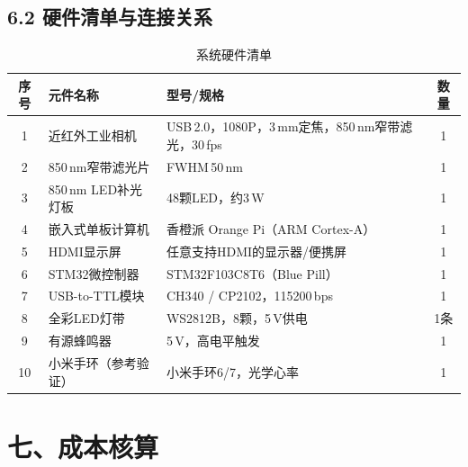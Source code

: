 \documentclass[a4paper,12pt]{article}
\begin{document}
\subsection*{6.2 硬件清单与连接关系}

\begin{table}[H]
  \centering
  \caption{系统硬件清单}
  \label{tab:bom}
  \renewcommand{\arraystretch}{1.3}
  \begin{tabular}{|c|p{4cm}|p{4.5cm}|c|}
    \hline
    \textbf{序号} & \textbf{元件名称} & \textbf{型号/规格} & \textbf{数量}\\
    \hline
    1 & 近红外工业相机 & USB\,2.0，1080P，3\,mm定焦，850\,nm窄带滤光，30\,fps & 1\\
    \hline
    2 & 850\,nm窄带滤光片 & FWHM\,50\,nm & 1\\
    \hline
    3 & 850\,nm LED补光灯板 & 48颗LED，约3\,W & 1\\
    \hline
    4 & 嵌入式单板计算机 & 香橙派 Orange Pi（ARM Cortex-A）& 1\\
    \hline
    5 & HDMI显示屏 & 任意支持HDMI的显示器/便携屏 & 1\\
    \hline
    6 & STM32微控制器 & STM32F103C8T6（Blue Pill）& 1\\
    \hline
    7 & USB-to-TTL模块 & CH340 / CP2102，115200\,bps & 1\\
    \hline
    8 & 全彩LED灯带 & WS2812B，8颗，5\,V供电 & 1条\\
    \hline
    9 & 有源蜂鸣器 & 5\,V，高电平触发 & 1\\
    \hline
    10 & 小米手环（参考验证） & 小米手环6/7，光学心率 & 1\\
    \hline
  \end{tabular}
\end{table}

\section*{七、成本核算}
\end{document}

